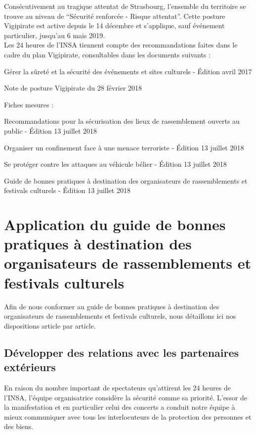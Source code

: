 \documentclass[hidelinks, paper=a4, fontsize=13pt]{report}
\begin{document}
Consécutivement au tragique attentat de Strasbourg, l'ensemble du territoire se trouve au niveau de “Sécurité renforcée - Risque attentat”.
Cette posture Vigipirate est active depuis le 14 décembre et s'applique, sauf événement particulier, jusqu'au 6 mais 2019.\\

Les 24 heures de l'INSA tiennent compte des recommandations faites dans le cadre du plan Vigipirate, consultables dans les documents suivants :
\begin{list}{•}{}
	\item Gérer la sûreté et la sécurité des événements et sites culturels - Édition avril 2017
	\item Note de posture Vigipirate du 28 février 2018
	\item Fiches mesures :
	\begin{list}{-}{}
		\item Recommandations pour la sécurisation des lieux de rassemblement ouverts au public - Édition 13 juillet 2018
		\item Organiser un confinement face à une menace terroriste - Édition 13 juillet 2018
		\item Se protéger contre les attaques au véhicule bélier - Édition 13 juillet 2018
	\end{list}
	\item Guide de bonnes pratiques à destination des organisateurs de rassemblements et festivals culturels - Édition 13 juillet 2018
\end{list}


\section{Application du guide de bonnes pratiques à destination des organisateurs de rassemblements et festivals culturels}

Afin de nous conformer au guide de bonnes pratiques à destination des organisateurs de rassemblements et festivals culturels, nous détaillons ici nos dispositions article par article.

\subsection{Développer des relations avec les partenaires extérieurs}

En raison du nombre important de spectateurs qu'attirent les 24 heures de l'INSA, l'équipe organisatrice considère la sécurité comme sa priorité. L'essor de la manifestation et en particulier celui des concerts a conduit notre équipe à mieux communiquer avec tous les interlocuteurs de la protection des personnes et des biens.\\
\end{document}
